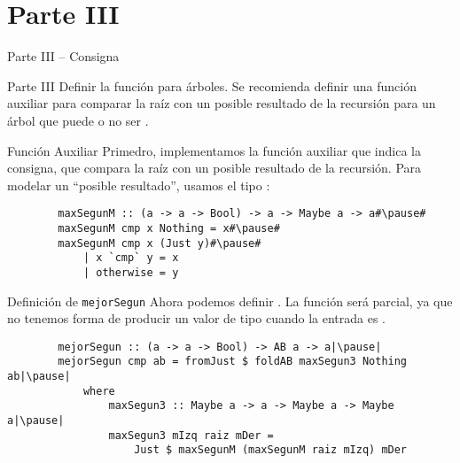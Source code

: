 \section{Parte III}

\begin{frame}{Parte III -- Consigna}
    \begin{exampleblock}{Parte III}
        Definir la función  para árboles. Se recomienda definir una función auxiliar para comparar la raíz con un posible resultado de la recursión para un árbol que puede o no ser .
    \end{exampleblock}
\end{frame}

\begin{frame}[fragile]{Función Auxiliar}
    Primedro, implementamos la función auxiliar que indica la consigna, que compara la raíz con un posible resultado de la recursión. Para modelar un ``posible resultado'', usamos el tipo :

    \pause

    \begin{verbatim}
        maxSegunM :: (a -> a -> Bool) -> a -> Maybe a -> a#\pause#
        maxSegunM cmp x Nothing = x#\pause#
        maxSegunM cmp x (Just y)#\pause#
            | x `cmp` y = x
            | otherwise = y
    \end{verbatim}
\end{frame}

\begin{frame}[fragile]{Definición de \texttt{mejorSegun}}
    Ahora podemos definir . La función será \alert{parcial}, ya que no tenemos forma de producir un valor de tipo  cuando la entrada es .

    \pause

    \begin{verbatim}
        mejorSegun :: (a -> a -> Bool) -> AB a -> a|\pause|
        mejorSegun cmp ab = fromJust $ foldAB maxSegun3 Nothing ab|\pause|
            where
                maxSegun3 :: Maybe a -> a -> Maybe a -> Maybe a|\pause|
                maxSegun3 mIzq raiz mDer =
                    Just $ maxSegunM (maxSegunM raiz mIzq) mDer
    \end{verbatim}
\end{frame}
